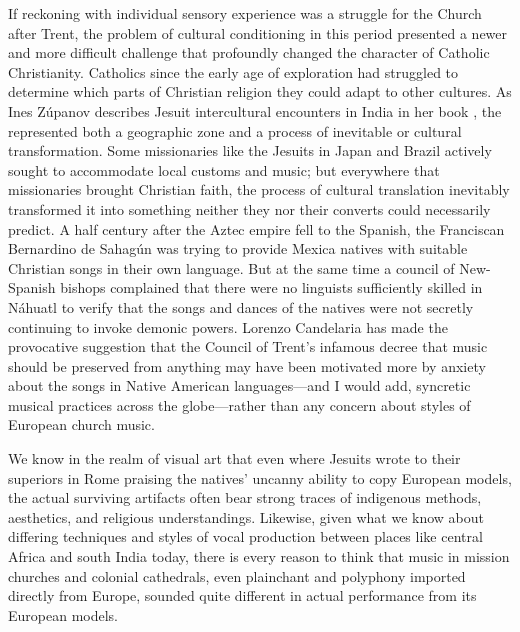 If reckoning with individual sensory experience was a struggle for the Church after Trent, the problem of cultural conditioning in this period presented a newer and more difficult challenge that profoundly changed the character of Catholic Christianity.
Catholics since the early age of exploration had struggled to determine which parts of Christian religion they could adapt to other cultures.
As Ines Zúpanov describes Jesuit intercultural encounters in India in her book , the  represented both a geographic zone and a process of inevitable  or cultural transformation.%
\Autocite[\XXX]{Zupanov:MissionaryTropics}
Some missionaries like the Jesuits in Japan and Brazil actively sought to accommodate local customs and music; but everywhere that missionaries brought Christian faith, the process of cultural translation inevitably transformed it into something neither they nor their converts could necessarily predict.
\Autocites{Bailey:Art}{Waterhouse:EarliestJapaneseContacts}
{Castagna:JesuitsConversionBrazil}
A half century after the Aztec empire fell to the Spanish, the Franciscan Bernardino de Sahagún was trying to provide Mexica natives with suitable Christian songs in their own language.
But at the same time a council of New-Spanish bishops complained that there were no linguists sufficiently skilled in Náhuatl to verify that the songs and dances of the natives were not secretly continuing to invoke demonic powers.
Lorenzo Candelaria has made the provocative suggestion that the Council of Trent's infamous decree that music should be preserved from anything  may have been motivated more by anxiety about the songs in Native American languages---and I would add, syncretic musical practices across the globe---rather than any concern about styles of European church music.%
\Autocites[\XXX]{Candelaria:Psalmodia} %

We know in the realm of visual art that even where Jesuits wrote to their superiors in Rome praising the natives' uncanny ability to copy European models, the actual surviving artifacts often bear strong traces of indigenous methods, aesthetics, and religious understandings.%
\Autocites[\XXX]{Bailey:Art}
Likewise, given what we know about differing techniques and styles of vocal production between places like central Africa and south India today, there is every reason to think that music in mission churches and colonial cathedrals, even plainchant and polyphony imported directly from Europe, sounded quite different in actual performance from its European models.


